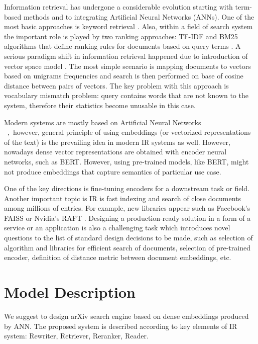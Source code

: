 \documentclass{article}
\begin{document}
    Information retrieval has undergone a considerable evolution starting with term-based methods and to integrating Artificial Neural Networks (ANNs). One of the most basic approaches is keyword retrieval \cite{salton1988term}. Also, within a field of search system the important role is played by two ranking approaches: TF-IDF and BM25 algorithms that define ranking rules for documents based on query terms \cite{robertson1995okapi}. A serious paradigm shift in information retrieval happened due to introduction of vector space model \cite{salton1975vector}. The most simple scenario is mapping documents to vectors based on unigrams frequencies and search is then performed on base of cosine distance between pairs of vectors. The key problem with this approach is vocabulary mismatch problem: query contains words that are not known to the system, therefore their statistics become unusable in this case. 
    
    Modern systems are mostly based on Artificial Neural Networks \\ \cite{lin2022pretrained}~,~however, general principle of using embeddings (or vectorized representations of the text) is the prevailing idea in modern IR systems as well. However, nowadays dense vector representations are obtained with encoder neural networks, such as BERT. However, using pre-trained models, like BERT, might not produce embeddings that capture semantics of particular use case. 
    
    One of the key directions is fine-tuning encoders for a downstream task or field. Another important topic is IR is fast indexing and search of close documents among millions of entries. For example, new libraries appear such as Facebook's FAISS \cite{faiss} or Nvidia's RAFT \cite{raft}. Designing a production-ready solution in a form of a service or an application is also a challenging task which introduces novel questions to the list of standard design decisions to be made, such as selection of algorithm and libraries for efficient search of documents, selection of pre-trained encoder, definition of distance metric between document embeddings, etc. 

\section{Model Description}\label{sec:methodology}
    We suggest to design arXiv search engine based on dense embeddings produced by ANN. The proposed system is described according to key elements of IR system: Rewriter, Retriever, Reranker, Reader.
    
\end{document}

